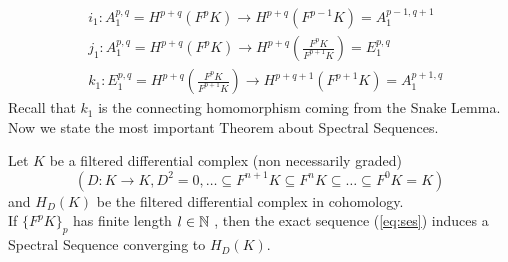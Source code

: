 \documentclass[../main.tex]{subfiles}
\begin{document}
\begin{align}
&i_1 \colon A_1^{p,q} = H^{p+q}(F^pK) \longrightarrow H^{p+q}(F^{p-1}K) = A_1^{p-1,q+1} \\
&j_1 \colon A_1^{p,q} = H^{p+q}(F^pK) 	\longrightarrow H^{p+q}\left( \frac{F^pK}{F^{p+1}K} \right) = E_1^{p,q} \\
&k_1 \colon E_1^{p,q} = H^{p+q} \left( \frac{F^pK}{F^{p+1}K} \right) 	\longrightarrow H^{p+q+1}(F^{p+1}K) = A_1^{p+1,q} 
\end{align}
Recall that $k_1$ is the connecting homomorphism coming from the Snake Lemma.
Now we state the most important Theorem about Spectral Sequences.
\begin{theorem}\label{ThmSpSeq}
    Let $K$ be a filtered differential complex (non necessarily graded)
    \[
    (D \colon K \to K  , D^2 = 0  , 
\ldots \subseteq F^{n+1}K\subseteq F^nK\subseteq \ldots \subseteq F^0K = K)
    \]
     and $H_D(K)$ be the filtered differential complex in cohomology. \\
     If $\{F^pK\}_p$ has finite length $l \in \mathbb{N}$ , then the exact sequence  (\ref{eq:ses}) induces a Spectral Sequence converging to $H_D(K)$.
\end{theorem}
\end{document}

